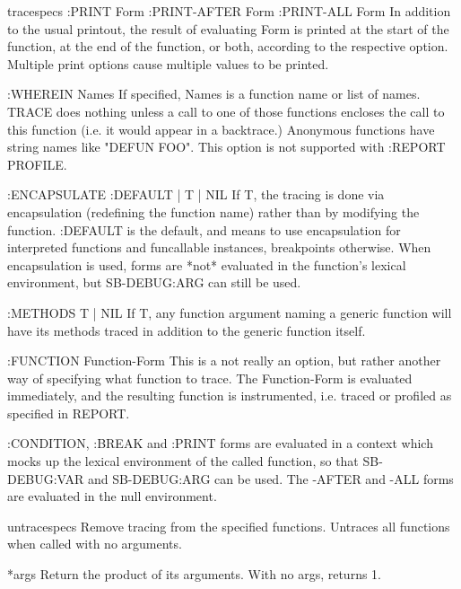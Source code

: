 \begin{macro}{trace}{\rest specs}{}{}
   :PRINT Form
   :PRINT-AFTER Form
   :PRINT-ALL Form
       In addition to the usual printout, the result of evaluating Form is
       printed at the start of the function, at the end of the function, or
       both, according to the respective option. Multiple print options cause
       multiple values to be printed.

   :WHEREIN Names
       If specified, Names is a function name or list of names. TRACE does
       nothing unless a call to one of those functions encloses the call to
       this function (i.e. it would appear in a backtrace.)  Anonymous
       functions have string names like "DEFUN FOO". This option is not
       supported with :REPORT PROFILE.

   :ENCAPSULATE {:DEFAULT | T | NIL}
       If T, the tracing is done via encapsulation (redefining the function
       name) rather than by modifying the function. :DEFAULT is the default,
       and means to use encapsulation for interpreted functions and funcallable
       instances, breakpoints otherwise. When encapsulation is used, forms are
       *not* evaluated in the function's lexical environment, but SB-DEBUG:ARG
       can still be used.

   :METHODS {T | NIL}
       If T, any function argument naming a generic function will have its
       methods traced in addition to the generic function itself.

   :FUNCTION Function-Form
       This is a not really an option, but rather another way of specifying
       what function to trace. The Function-Form is evaluated immediately,
       and the resulting function is instrumented, i.e. traced or profiled
       as specified in REPORT.

:CONDITION, :BREAK and :PRINT forms are evaluated in a context which
mocks up the lexical environment of the called function, so that
SB-DEBUG:VAR and SB-DEBUG:ARG can be used. The -AFTER and -ALL forms
are evaluated in the null environment.
\end{macro}

\begin{macro}{untrace}{\rest specs}{}{}
  Remove tracing from the specified functions. Untraces all
functions when called with no arguments.
\end{macro}

\begin{variable}{*}{\rest args}{}{}
  Return the product of its arguments. With no args, returns 1.
\end{variable}

